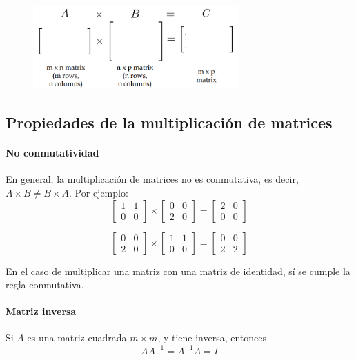 \begin{figure}[h]
\centering
\includegraphics[width = 0.7\textwidth]{figs/matrix-matrix-mult.png}
\end{figure}

\subsection{Propiedades de la multiplicación de matrices}
\paragraph{No conmutatividad} En general, la multiplicación de matrices no es conmutativa, es decir, $A \times B \neq B \times A$. Por ejemplo:
$$\begin{bmatrix}
1 & 1 \\ 0 & 0
\end{bmatrix} \times \begin{bmatrix}
0 & 0 \\ 2 & 0
\end{bmatrix} = \begin{bmatrix}
2 & 0 \\ 0 & 0
\end{bmatrix} $$

$$\begin{bmatrix}
0 & 0 \\ 2 & 0
\end{bmatrix} \times \begin{bmatrix}
1 & 1 \\ 0 & 0
\end{bmatrix} = \begin{bmatrix}
0 & 0 \\ 2 & 2
\end{bmatrix} $$

En el caso de multiplicar una matriz con una matriz de identidad, sí se cumple la regla conmutativa.

\paragraph{Matriz inversa} Si $A$ es una matriz cuadrada $m \times m$, y tiene inversa, entonces
$$AA^{-1} = A^{-1}A = I$$

